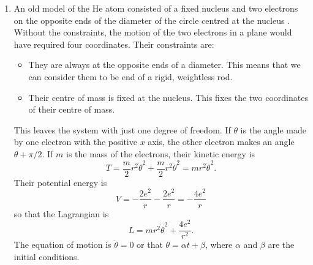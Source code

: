 \begin{enumerate}
\item An old model of the He atom consisted of a fixed nucleus and two
electrons on the opposite ends of the diameter of the circle centred at
the nucleus \cite[Problem 3, chapter 4]{akr}. Without the constraints, the
motion of the two electrons in a plane would have required four coordinates.
Their constraints are:
\begin{itemize}
\item They are always at the opposite ends of a diameter. This means that
we can consider them to be end of a rigid, weightless rod.
\item Their centre of mass is fixed at the nucleus. This fixes the two 
coordinates of their centre of mass.
\end{itemize}
This leaves the system with just one degree of freedom. If $\theta$ is the
angle made by one electron with the positive $x$ axis, the other electron
makes an angle $\theta + \pi/2$. If $m$ is the mass of the electrons, their
kinetic energy is
\[
T = \frac{m}{2}r^2\dot{\theta}^2 + \frac{m}{2}r^2\dot{\theta}^2 =
mr^2\dot{\theta}^2.
\]
Their potential energy is
\[
V = -\frac{2e^2}{r} - \frac{2e^2}{r} = -\frac{4e^2}{r}
\]
so that the Lagrangian is
\[
L = mr^2\dot{\theta}^2 + \frac{4e^2}{r^2}.
\]
The equation of motion is $\ddot{\theta} = 0$ or that $\theta = \alpha t + 
\beta$, where $\alpha$ and $\beta$ are the initial conditions.
\end{enumerate}
